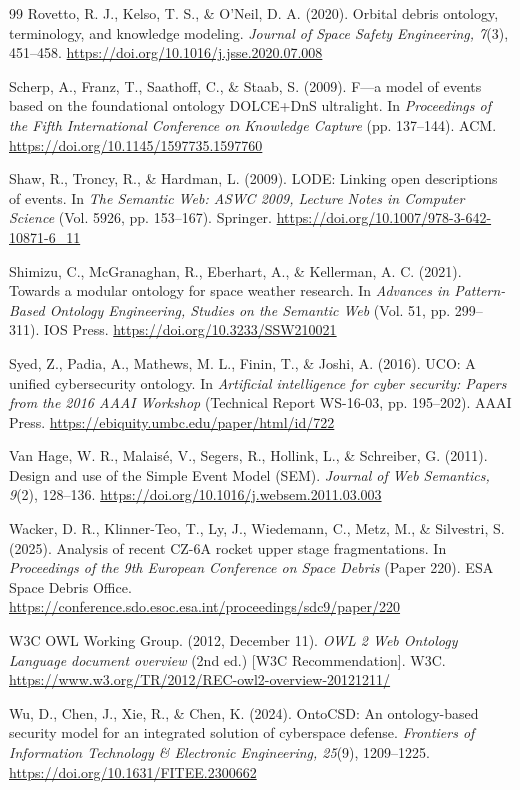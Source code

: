\documentclass[Royal,sageh,times]{sagej}
\begin{document}
\begin{thebibliography}{99}
Rovetto, R. J., Kelso, T. S., \& O'Neil, D. A. (2020). Orbital debris ontology, terminology, and knowledge modeling. \textit{Journal of Space Safety Engineering, 7}(3), 451--458. \url{https://doi.org/10.1016/j.jsse.2020.07.008}

Scherp, A., Franz, T., Saathoff, C., \& Staab, S. (2009). F---a model of events based on the foundational ontology DOLCE+DnS ultralight. In \textit{Proceedings of the Fifth International Conference on Knowledge Capture} (pp. 137--144). ACM. \url{https://doi.org/10.1145/1597735.1597760}

Shaw, R., Troncy, R., \& Hardman, L. (2009). LODE: Linking open descriptions of events. In \textit{The Semantic Web: ASWC 2009, Lecture Notes in Computer Science} (Vol. 5926, pp. 153--167). Springer. \url{https://doi.org/10.1007/978-3-642-10871-6_11}

Shimizu, C., McGranaghan, R., Eberhart, A., \& Kellerman, A. C. (2021). Towards a modular ontology for space weather research. In \textit{Advances in Pattern-Based Ontology Engineering, Studies on the Semantic Web} (Vol. 51, pp. 299--311). IOS Press. \url{https://doi.org/10.3233/SSW210021}

Syed, Z., Padia, A., Mathews, M. L., Finin, T., \& Joshi, A. (2016). UCO: A unified cybersecurity ontology. In \textit{Artificial intelligence for cyber security: Papers from the 2016 AAAI Workshop} (Technical Report WS-16-03, pp. 195--202). AAAI Press. \url{https://ebiquity.umbc.edu/paper/html/id/722}

Van Hage, W. R., Malais\'{e}, V., Segers, R., Hollink, L., \& Schreiber, G. (2011). Design and use of the Simple Event Model (SEM). \textit{Journal of Web Semantics, 9}(2), 128--136. \url{https://doi.org/10.1016/j.websem.2011.03.003}

Wacker, D. R., Klinner-Teo, T., Ly, J., Wiedemann, C., Metz, M., \& Silvestri, S. (2025). Analysis of recent CZ-6A rocket upper stage fragmentations. In \textit{Proceedings of the 9th European Conference on Space Debris} (Paper 220). ESA Space Debris Office. \url{https://conference.sdo.esoc.esa.int/proceedings/sdc9/paper/220}

W3C OWL Working Group. (2012, December 11). \textit{OWL 2 Web Ontology Language document overview} (2nd ed.) [W3C Recommendation]. W3C. \url{https://www.w3.org/TR/2012/REC-owl2-overview-20121211/}

Wu, D., Chen, J., Xie, R., \& Chen, K. (2024). OntoCSD: An ontology-based security model for an integrated solution of cyberspace defense. \textit{Frontiers of Information Technology \& Electronic Engineering, 25}(9), 1209--1225. \url{https://doi.org/10.1631/FITEE.2300662}

\end{thebibliography}
\end{document}
